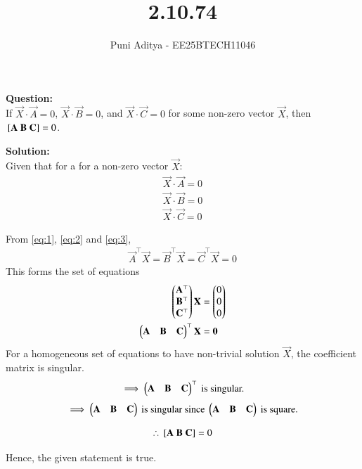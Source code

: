 \documentclass[journal]{IEEEtran}
\begin{document}
\title{2.10.74}
\author{Puni Aditya - EE25BTECH11046}
\maketitle

\textbf{Question:}\\
If $\vec{X} \cdot \vec{A} = 0$, $\vec{X} \cdot \vec{B} = 0$, and $\vec{X} \cdot \vec{C} = 0$ for some non-zero vector $\vec{X}$, then ${}\left[\mathbf{A}\ \mathbf{B}\ \mathbf{C}\right] = 0$.

\textbf{Solution:}\\
Given that for a for a non-zero vector $\vec{X}$:
\begin{align}
    \vec{X} \cdot \vec{A} = 0 \label{eq:1} \\
    \vec{X} \cdot \vec{B} = 0 \label{eq:2} \\
    \vec{X} \cdot \vec{C} = 0 \label{eq:3}
\end{align}

From \eqref{eq:1}, \eqref{eq:2} and \eqref{eq:3},
\begin{align}
    \vec{A}^\top \vec{X} = \vec{B}^\top \vec{X} = \vec{C}^\top \vec{X} = 0
\end{align}
This forms the set of equations
\begin{align}
    \begin{pmatrix}\mathbf{A}^\top \\ \mathbf{B}^\top \\ \mathbf{C}^\top\end{pmatrix} \mathbf{X} &= \begin{pmatrix}0 \\ 0 \\ 0\end{pmatrix} \\
    \begin{pmatrix}\mathbf{A} & \mathbf{B} & \mathbf{C}\end{pmatrix}^\top\mathbf{X} &= \mathbf{0}
\end{align}
For a homogeneous set of equations to have non-trivial solution $\vec{X}$, the coefficient matrix is singular.
\begin{align*}
    \implies \begin{pmatrix}\mathbf{A} & \mathbf{B} & \mathbf{C}\end{pmatrix}^\top\text{ is singular.}
\end{align*}
\begin{align*}
    \implies \begin{pmatrix}\mathbf{A} & \mathbf{B} & \mathbf{C}\end{pmatrix}\text{ is singular since }\begin{pmatrix}\mathbf{A} & \mathbf{B} & \mathbf{C}\end{pmatrix}\text{ is square.}
\end{align*}

\begin{align*}
    \therefore {}\left[\mathbf{A}\ \mathbf{B}\ \mathbf{C}\right] = 0
\end{align*}

Hence, the given statement is true. \\
\end{document}
